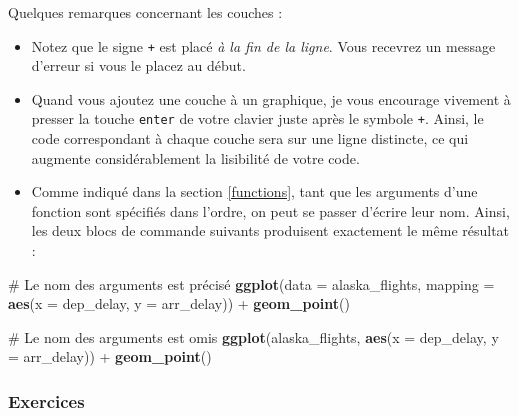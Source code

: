 \documentclass[a4paperpaper,]{article}
\newenvironment{Shaded}{\begin{snugshade}}{\end{snugshade}}
\newcommand{\CommentTok}[1]{\textcolor[rgb]{0.54,0.53,0.53}{#1}}
\newcommand{\DataTypeTok}[1]{\textcolor[rgb]{0.00,0.34,0.68}{#1}}
\newcommand{\KeywordTok}[1]{\textcolor[rgb]{0.12,0.11,0.11}{\textbf{#1}}}
\newcommand{\NormalTok}[1]{\textcolor[rgb]{0.12,0.11,0.11}{#1}}
\newcommand{\OperatorTok}[1]{\textcolor[rgb]{0.12,0.11,0.11}{#1}}
\newcommand{\StringTok}[1]{\textcolor[rgb]{0.75,0.01,0.01}{#1}}
\providecommand{\tightlist}{%
  \setlength{\itemsep}{0pt}\setlength{\parskip}{0pt}}
\theoremstyle{definition}
\theoremstyle{definition}
\theoremstyle{definition}
\theoremstyle{remark}
\begin{document}
Quelques remarques concernant les couches :

\begin{itemize}
\tightlist
\item
  Notez que le signe \texttt{+} est placé \emph{à la fin de la ligne}.
  Vous recevrez un message d'erreur si vous le placez au début.
\item
  Quand vous ajoutez une couche à un graphique, je vous encourage
  vivement à presser la touche \texttt{enter} de votre clavier juste
  après le symbole \texttt{+}. Ainsi, le code correspondant à chaque
  couche sera sur une ligne distincte, ce qui augmente considérablement
  la lisibilité de votre code.
\item
  Comme indiqué dans la section \ref{functions}, tant que les arguments
  d'une fonction sont spécifiés dans l'ordre, on peut se passer d'écrire
  leur nom. Ainsi, les deux blocs de commande suivants produisent
  exactement le même résultat :
\end{itemize}

\begin{Shaded}
\begin{Highlighting}[]
\CommentTok{# Le nom des arguments est précisé}
\KeywordTok{ggplot}\NormalTok{(}\DataTypeTok{data =}\NormalTok{ alaska_flights, }\DataTypeTok{mapping =} \KeywordTok{aes}\NormalTok{(}\DataTypeTok{x =}\NormalTok{ dep_delay, }\DataTypeTok{y =}\NormalTok{ arr_delay)) }\OperatorTok{+}\StringTok{ }
\StringTok{  }\KeywordTok{geom_point}\NormalTok{()}

\CommentTok{# Le nom des arguments est omis}
\KeywordTok{ggplot}\NormalTok{(alaska_flights, }\KeywordTok{aes}\NormalTok{(}\DataTypeTok{x =}\NormalTok{ dep_delay, }\DataTypeTok{y =}\NormalTok{ arr_delay)) }\OperatorTok{+}\StringTok{ }
\StringTok{  }\KeywordTok{geom_point}\NormalTok{()}
\end{Highlighting}
\end{Shaded}

\hypertarget{exercices-2}{%
\subsubsection{Exercices}\label{exercices-2}}
\end{document}
